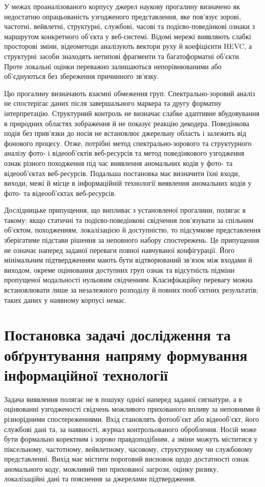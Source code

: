 У межах проаналізованого корпусу джерел наукову прогалину визначено як недостатню опрацьованість узгодженого представлення, яке пов’язує зорові, частотні, вейвлетні, структурні, службові, часові та подієво-поведінкові ознаки з маршрутом конкретного об’єкта у веб-системі. Відомі мережі виявляють слабкі просторові зміни, відеометоди аналізують вектори руху й коефіцієнти HEVC, а структурні засоби знаходять нетипові фрагменти та багатоформатні об’єкти. Проте локальні оцінки переважно залишаються непорівнюваними або об’єднуються без збереження причинного зв’язку.

Цю прогалину визначають взаємні обмеження груп. Спектрально-зоровий аналіз не спостерігає даних після завершального маркера та другу форматну інтерпретацію. Структурний контроль не визначає слабке адаптивне вбудовування в природних областях зображення й не показує реакцію декодера. Поведінкова подія без прив’язки до носія не встановлює джерельну область і залежить від фонового процесу. Отже, потрібні метод спектрально-зорового та структурного аналізу фото- і відеооб’єктів веб-ресурсів та метод поведінкового узгодження ознак різного походження під час виявлення аномальних кодів у фото- та відеооб’єктах веб-ресурсів. Подальша постановка має визначити їхні входи, виходи, межі й місце в інформаційній технології виявлення аномальних кодів у фото- та відеооб’єктах веб-ресурсів.

Дослідницьке припущення, що випливає з установленої прогалини, полягає в такому: якщо статичні та подієво-поведінкові свідчення пов’язувати за спільним об’єктом, походженням, локалізацією й доступністю, то підсумкове представлення зберігатиме підстави рішення за неповного набору спостережень. Це припущення не означає наперед заданої переваги повної навчуваної конфігурації. Його мінімальним підтвердженням мають бути відтворюваний зв’язок між входами й виходом, окреме оцінювання доступних груп ознак та відсутність підміни пропущеної модальності нульовим свідченням. Класифікаційну перевагу можна встановлювати лише за незалежного розподілу й повних пооб’єктних результатів; таких даних у наявному корпусі немає.

\section{Постановка задачі дослідження та обґрунтування напряму формування інформаційної технології}
\label{sec:research_problem}

Задача виявлення полягає не в пошуку однієї наперед заданої сигнатури, а в оцінюванні узгодженості свідчень можливого прихованого впливу за неповними й різнорідними спостереженнями. Вхід становлять фотооб’єкт або відеооб’єкт, його службові дані та, за наявності, журнал контрольованого оброблення. Носій може бути формально коректним і зорово правдоподібним, а зміни можуть міститися у піксельному, частотному, вейвлетному, часовому, структурному чи службовому представленні. Вихід має містити пороговий висновок щодо достатності ознак аномального коду, можливий тип прихованої загрози, оцінку ризику, локалізаційні дані та пояснення за джерелами підтвердження.

